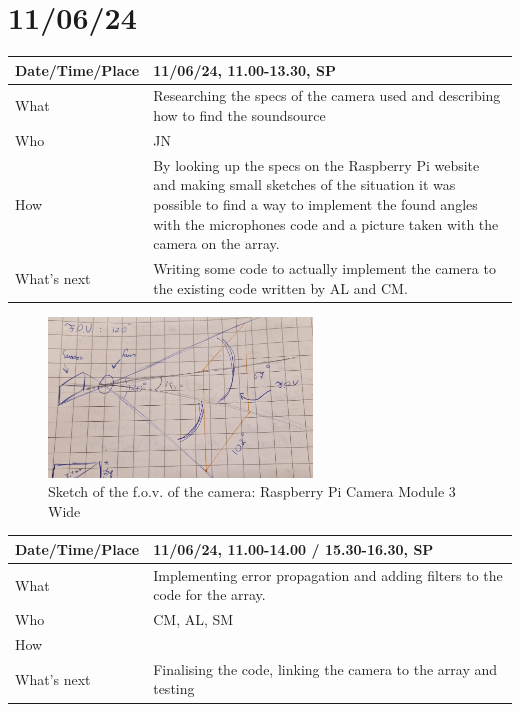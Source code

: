 \documentclass{article}
\begin{document}
\section{11/06/24}

\begin{table}[H]
\begin{tabular}{|p{1.5in}|p{4in}|}
\hline
Date/Time/Place &  11/06/24, 11.00-13.30, SP\\ \hline
What            &  Researching the specs of the camera used and describing how to find the soundsource\\ \hline
Who             &  JN\\ \hline
How             &  By looking up the specs on the Raspberry Pi website and making small sketches of the situation it was possible to find a way to implement the found angles with the microphones code and a picture taken with the camera on the array. \\ \hline
What's next     &  Writing some code to actually implement the camera to the existing code written by AL and CM.\\ \hline
\end{tabular}
\end{table}

\begin{figure}[H]
    \centering
    \includegraphics[width=7cm]{Foto tekening sensor en F.O.V..jpg}
    \caption{Sketch of the f.o.v. of the camera: Raspberry Pi Camera Module 3 Wide}   
\end{figure}


\begin{table}[H]
\begin{tabular}{|p{1.5in}|p{4in}|}
\hline
Date/Time/Place & 11/06/24, 11.00-14.00 / 15.30-16.30, SP \\ \hline
What            & Implementing error propagation and adding filters to the code for the array. \\ \hline
Who             & CM, AL, SM \\ \hline
How             &  \\ \hline
What's next     & Finalising the code, linking the camera to the array and testing \\ \hline
\end{tabular}
\end{table}
\end{document}
